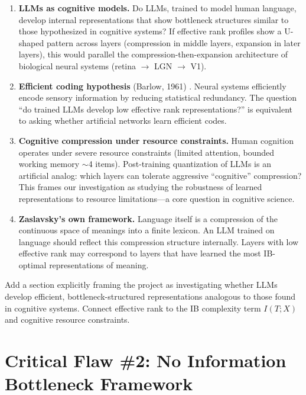 \documentclass[11pt,a4paper]{article}
\begin{document}
\begin{enumerate}[label=(\alph*)]
    \item \textbf{LLMs as cognitive models.} Do LLMs, trained to model human language, develop internal representations that show bottleneck structures similar to those hypothesized in cognitive systems? If effective rank profiles show a U-shaped pattern across layers (compression in middle layers, expansion in later layers), this would parallel the compression-then-expansion architecture of biological neural systems (retina $\to$ LGN $\to$ V1).

    \item \textbf{Efficient coding hypothesis} (Barlow, 1961) \cite{barlow1961possible}. Neural systems efficiently encode sensory information by reducing statistical redundancy. The question ``do trained LLMs develop low effective rank representations?'' is equivalent to asking whether artificial networks learn efficient codes.

    \item \textbf{Cognitive compression under resource constraints.} Human cognition operates under severe resource constraints (limited attention, bounded working memory $\sim$4 items). Post-training quantization of LLMs is an artificial analog: which layers can tolerate aggressive ``cognitive'' compression? This frames our investigation as studying the robustness of learned representations to resource limitations---a core question in cognitive science.

    \item \textbf{Zaslavsky's own framework.} Language itself is a compression of the continuous space of meanings into a finite lexicon. An LLM trained on language should reflect this compression structure internally. Layers with low effective rank may correspond to layers that have learned the most IB-optimal representations of meaning.
\end{enumerate}

\begin{fixbox}
Add a section explicitly framing the project as investigating whether LLMs develop efficient, bottleneck-structured representations analogous to those found in cognitive systems. Connect effective rank to the IB complexity term $I(T;X)$ and cognitive resource constraints.
\end{fixbox}

\section{Critical Flaw \#2: No Information Bottleneck Framework}
\end{document}
